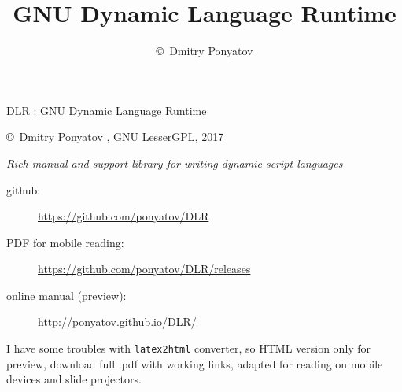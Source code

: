

\title{GNU Dynamic Language Runtime}
\author{\copyright\ Dmitry Ponyatov }


\maketitle

{\Large DLR : GNU Dynamic Language Runtime}

\bigskip
\copyright\ Dmitry Ponyatov  , GNU LesserGPL, 2017

\bigskip
\emph{Rich manual and support library for writing dynamic script languages}  
\bigskip

\begin{description}
\item[github:] \url{https://github.com/ponyatov/DLR}
\item[PDF for mobile reading:] \url{https://github.com/ponyatov/DLR/releases}
\item[online manual (preview):] \url{http://ponyatov.github.io/DLR/}
\end{description}

\noindent
I have some troubles with \verb|latex2html| converter, so HTML version only for
preview, download full .pdf with working links, adapted for reading on mobile
devices and slide projectors.

\tableofcontents













